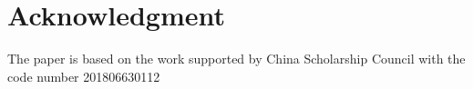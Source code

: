 \section*{Acknowledgment}
The paper is based on the work supported by China Scholarship Council with
the code number 201806630112

